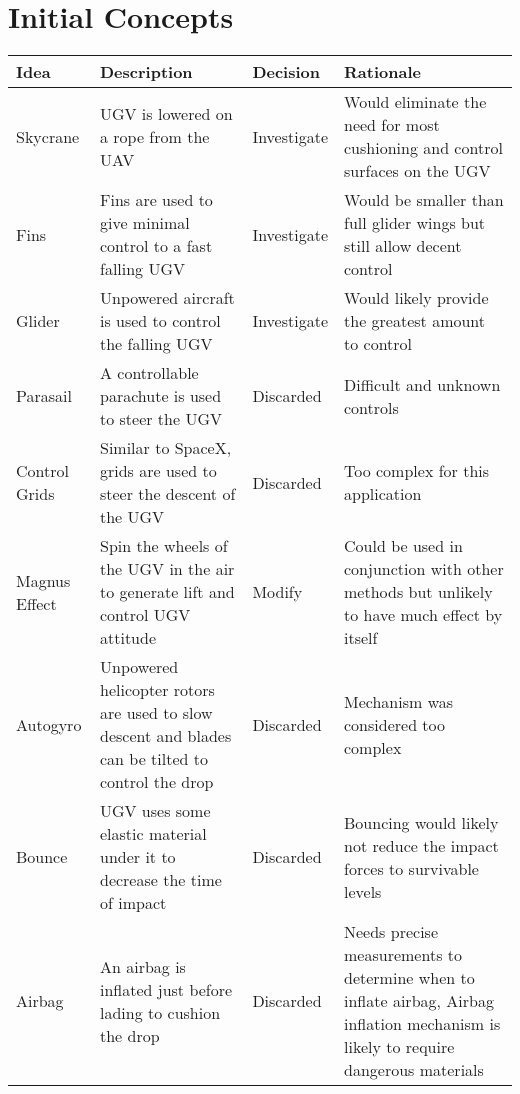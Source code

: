 \documentclass[]{auvsi_doc}
\begin{document}
\section{Initial Concepts}
\begin{center}
\begin{longtable}[H]{|p{}|p{}|p{}|p{}|}
\hline
\textbf{Idea}	&	\textbf{Description}	&	\textbf{Decision} &	\textbf{Rationale} \\
\hline
Skycrane & UGV is lowered on a rope from the UAV & Investigate & Would eliminate the need for most cushioning and control surfaces on the UGV\\
\hline
Fins & Fins are used to give minimal control to a fast falling UGV & Investigate & Would be smaller than full glider wings but still allow decent control\\
\hline
Glider & Unpowered aircraft is used to control the falling UGV & Investigate & Would likely provide the greatest amount to control\\
\hline
Parasail & A controllable parachute is used to steer the UGV & Discarded & Difficult and unknown controls \\
\hline
Control Grids & Similar to SpaceX, grids are used to steer the descent of the UGV & Discarded & Too complex for this application \\
\hline
Magnus Effect & Spin the wheels of the UGV in the air to generate lift and control UGV attitude & Modify & Could be used in conjunction with other methods but unlikely to have much effect by itself\\
\hline
Autogyro & Unpowered helicopter rotors are used to slow descent and blades can be tilted to control the drop & Discarded & Mechanism was considered too complex \\
\hline
Bounce & UGV uses some elastic material under it to decrease the time of impact & Discarded & Bouncing would likely not reduce the impact forces to survivable levels \\
\hline
Airbag & An airbag is inflated just before lading to cushion the drop & Discarded & Needs precise measurements to determine when to inflate airbag, Airbag inflation mechanism is likely to require dangerous materials\\

\end{longtable}
\end{center}
\end{document}

